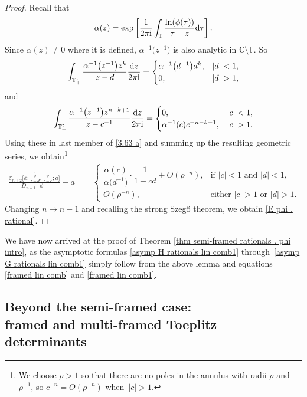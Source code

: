 \documentclass[pdftex]{sigma}
\numberwithin{equation}{section}
\newcommand{\C}{{\mathbb C}}
\newcommand{\T}{{\mathbb T}}
\newcommand{\al}{\alpha}
\newcommand{\ii}{{\rm i}}
\newcommand{\dd}{{\rm d}}
\begin{document}
\begin{proof}
			Recall that \[			\al(z)=\exp \left[ \frac{1}{2 \pi {\rm i} } \int_{\T} \frac{\ln(\phi(\tau))}{\tau-z}{\rm d}\tau \right].\] Since $\al(z) \neq 0$ where it is defined, $\al^{-1}\big(z^{-1}\big)$ is also analytic in $\C \setminus \T$. So
			\begin{equation*}
				\int_{\T^{\mathfrak{r}}_{+}} \frac{\al^{-1}\big(z^{-1}\big) z^{k}}{z-d} \frac{\dd z}{2 \pi \ii} = \begin{cases}
					\al^{-1}\big(d^{-1}\big) d^{k}, & |d|<1, \\
					0, & |d|>1,
				\end{cases}
			\end{equation*}
			and
			\begin{equation*}
				\int_{\T^{\mathfrak{r}}_{+}} \frac{\al^{-1}\big(z^{-1}\big) z^{n+k+1}}{z-c^{-1}} \frac{\dd z}{2 \pi \ii} = \begin{cases}
					0, & |c|<1, \\
					\al^{-1}(c) c^{-n-k-1}, & |c|>1.
				\end{cases}
			\end{equation*}
			Using these in last member of \eqref{3.63 a} and summing up the resulting geometric series, we obtain\footnote{We choose $\rho>1$ so that there are no poles in the annulus with radii $\rho$ and $\rho^{-1}$, so $c^{-n} = O(\rho^{-n})$ when~${|c|>1}$.}
			\begin{align*}%
					\frac{\mathscr{E}_{n+2}\big[\phi; \tfrac{\tilde{\phi}}{z-d}, \tfrac{\phi}{z-c} ;a\big]}{D_{n+1}[\phi]} - a = & \begin{cases}
						 \dfrac{\al(c)}{\al\big(d^{-1}\big)}\cdot \dfrac{1}{1-cd} + O(\rho^{-n}), 		 & \text{if $|c|<1$ and $|d|<1$}, \\
						O(\rho^{-n}), & \text{either $|c|>1$ or $|d|>1$}.
					\end{cases}
			\end{align*}
			Changing $n \mapsto n-1$ and recalling the strong Szeg\H{o} theorem, we obtain \eqref{E phi . rational}.		
		\end{proof}

We have now arrived at the proof of Theorem \ref{thm semi-framed rationals . phi intro}, as the asymptotic formulas \eqref{asymp H rationals lin comb1} through~\eqref{asymp G rationals lin comb1} simply follow from the above lemma and equations \eqref{framed lin comb} and \eqref{framed lin comb1}.
		
		\subsection[Beyond the semi-framed case: framed and multi-framed Toeplitz determinants]{Beyond the semi-framed case: \\
framed and multi-framed Toeplitz determinants}\label{sec framed and multi-framed}
		
\end{document}

